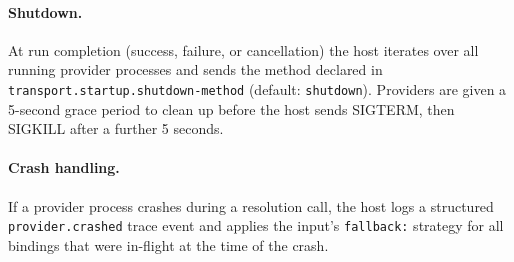 \paragraph{Shutdown.}
At run completion (success, failure, or cancellation) the host iterates over
all running provider processes and sends the method declared in
\texttt{transport.startup.shutdown-method} (default: \texttt{shutdown}).
Providers are given a 5-second grace period to clean up before the host sends
SIGTERM, then SIGKILL after a further 5 seconds.

\paragraph{Crash handling.}
If a provider process crashes during a resolution call, the host logs a
structured \texttt{provider.crashed} trace event and applies the input's
\texttt{fallback:} strategy for all bindings that were in-flight at the time
of the crash.
